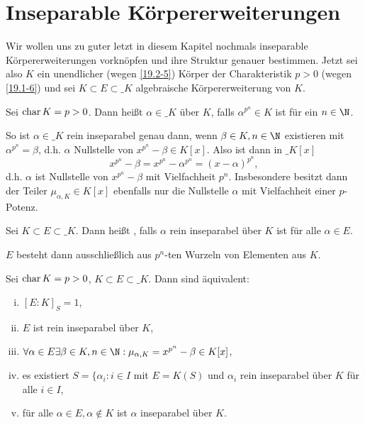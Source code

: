 \section{Inseparable Körpererweiterungen}

Wir wollen uns zu guter letzt in diesem Kapitel nochmals inseparable Körpererweiterungen vorknöpfen und ihre Struktur genauer bestimmen.
Jetzt sei also $K$ ein unendlicher (wegen \ref{19.2-5}) Körper der Charakteristik $p > 0$ (wegen \ref{19.1-6}) und sei $K \subset E \subset \_K$ algebraische Körpererweiterung von $K$.

\begin{df} \label{19.6-1}
	Sei $\operatorname{char} K = p > 0$.
	Dann heißt $\alpha \in \_K$  über $K$, falls $\alpha^{p^n} \in K$ ist für ein $n \in \N$.
	\begin{note}
		So ist $\alpha \in \_K$ rein inseparabel genau dann, wenn $\beta \in K, n \in \N$ existieren mit $\alpha^{p^n} = \beta$, d.h. $\alpha$ Nullstelle von $x^{p^n} - \beta \in K[x]$.
		Also ist dann in $\_K[x]$
		\[
			x^{p^n} - \beta
			= x^{p^n} - \alpha^{p^n}
			= (x - \alpha)^{p^n},
		\]
		d.h. $\alpha$ ist Nullstelle von $x^{p^n} - \beta$ mit Vielfachheit $p^n$.
		Insbesondere besitzt dann der Teiler $\mu_{\alpha, K} \in K[x]$ ebenfalls nur die Nullstelle $\alpha$ mit Vielfachheit einer $p$-Potenz.
	\end{note}
\end{df}

\begin{df} \label{19.6-2}
	Sei $K \subset E \subset \_K$.
	Dann heißt , falls $\alpha$ rein inseparabel über $K$ ist für alle $\alpha \in E$.
	\begin{note}
		$E$ besteht dann ausschließlich aus $p^n$-ten Wurzeln von Elementen aus $K$.
	\end{note}
\end{df}

\begin{st} \label{19.6-3}
	Sei $\operatorname{char} K = p > 0$, $K \subset E \subset \_K$.
	Dann sind äquivalent:
	\begin{enumerate}[i)]
		\item
			$[E : K]_S = 1$,
		\item
			$E$ ist rein inseparabel über $K$,
		\item
			$\forall \alpha \in E \exists \beta \in K, n \in \N : \mu_{\alpha, K} = x^{p^n} - \beta \in K[x]$,
		\item
			es existiert $S = \{\alpha_i : i \in I$ mit $E = K(S)$ und $\alpha_i$ rein inseparabel über $K$ für alle $i \in I$,
		\item
			für alle $\alpha \in E, \alpha \not\in K$ ist $\alpha$ inseparabel über $K$.
	\end{enumerate}
\end{st}

